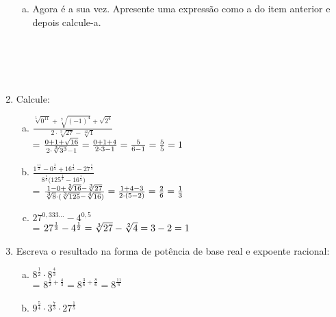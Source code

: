 \documentclass[a4paper,14pt]{article}
\begin{document}
\begin{multicols}{2}
\begin{enumerate}
\begin{enumerate}[a)]
            \item Agora é a sua vez. Apresente uma expressão como a do item anterior e depois calcule-a. \\\\\\\\\\
        \end{enumerate}
        \item Calcule:
        \begin{enumerate}[a)]
        	\item $\frac{\sqrt[5]{0^{11}} + \sqrt[9]{(-1)^4} + \sqrt{2^4}}{2 \cdot \sqrt[3]{27}- \sqrt[12]{1}}$ \\= $\frac{0 + 1 + \sqrt{16}}{2 \cdot \sqrt[3]{3^3} - 1} = \frac{0 + 1 + 4}{2 \cdot 3 - 1} \\= \frac{5}{6 - 1} = \frac{5}{5} = 1$\\
        	\item $\frac{1^\frac{11}{2} - 0^\frac{3}{4} + 16^\frac{1}{2} - 27^\frac{1}{3}}{8^\frac{1}{3} \bigg(125^\frac{1}{3} - 16^\frac{1}{4} \bigg)}$ 
        	\\= $\frac{1 - 0 + \sqrt[2]{16} - \sqrt[3]{27}}{\sqrt[3]{8} \cdot (\sqrt[3]{125} - \sqrt[4]{16})} \\\\\\= \frac{1+4-3}{2 \cdot (5-2)} = \frac{2}{6} = \frac{1}{3}$ \\
        	\item $27^{0,333...} - 4^{0,5}$ \\
        	= $27^\frac{1}{3} - 4^\frac{1}{2} \\\\
        	= \sqrt[3]{27} - \sqrt[2]{4} \\\\
        	= 3 - 2 = 1$ 
       \end{enumerate}
       \item Escreva o resultado na forma de potência de base real e expoente racional:
       \begin{enumerate}[a)]
           \item $8^\frac{1}{2} \cdot 8^\frac{4}{3}$ \\ 
           = $8^{\frac{1}{2} + \frac{4}{3}} = 8^{\frac{3}{6} + \frac{8}{6}} = 8^\frac{11}{6}$\\
           \item $9^\frac{5}{4} \cdot 3^\frac{7}{3} \cdot 27^\frac{1}{5}$ \\

\end{enumerate}
\end{enumerate}
\end{multicols}
\end{document}
